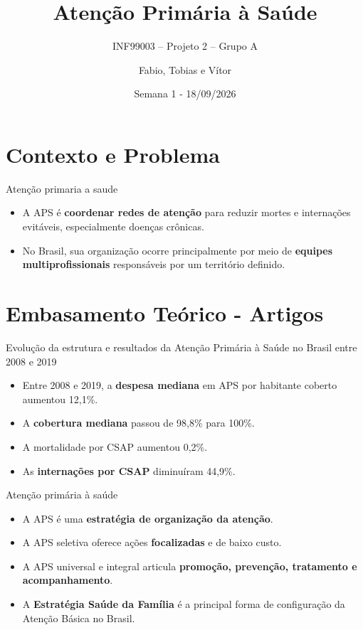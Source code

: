 ﻿\documentclass[aspectratio=169]{beamer}
\title[APS e Planejamento de Visitas]{Aten\c{c}\~ao Prim\'aria \`a Sa\'ude\\}
\subtitle{INF99003 -- Projeto 2 -- Grupo A}
\author{Fabio, Tobias e Vítor}
\date{Semana 1 - 18/09/2026}
\begin{document}
\begin{frame}
  \titlepage
\end{frame}

\section{Contexto e Problema}

\begin{frame}{Atenção primaria a saude}
  \begin{itemize}
    \item A APS é \textbf{coordenar redes de atenção} para reduzir mortes e internações evitáveis, especialmente doenças crônicas. \\
    \item No Brasil, sua organização ocorre principalmente por meio de \textbf{equipes multiprofissionais} responsáveis por um território definido.
  \end{itemize}
\end{frame}


\section{Embasamento Te\'orico - Artigos}

\begin{frame}{Evolução da estrutura e resultados da Atenção Primária à Saúde no Brasil entre 2008 e 2019}
  \begin{itemize}
    \item Entre 2008 e 2019, a \textbf{despesa mediana} em APS por habitante coberto aumentou 12,1\%.
    \item A \textbf{cobertura mediana} passou de 98,8\% para 100\%.
    \item A mortalidade por CSAP aumentou 0,2\%.
    \item As \textbf{internações por CSAP} diminuíram 44,9\%.
  \end{itemize}
\end{frame}

\begin{frame}{Atenção primária à saúde}
  \begin{itemize}
    \item A APS é uma \textbf{estratégia de organização da atenção}.
    \item A APS seletiva oferece ações \textbf{focalizadas} e de baixo custo.
    \item A APS universal e integral articula \textbf{promoção, prevenção, tratamento e acompanhamento}.
    \item A \textbf{Estratégia Saúde da Família} é a principal forma de configuração da Atenção Básica no Brasil.
  \end{itemize}
\end{frame}
\end{document}
